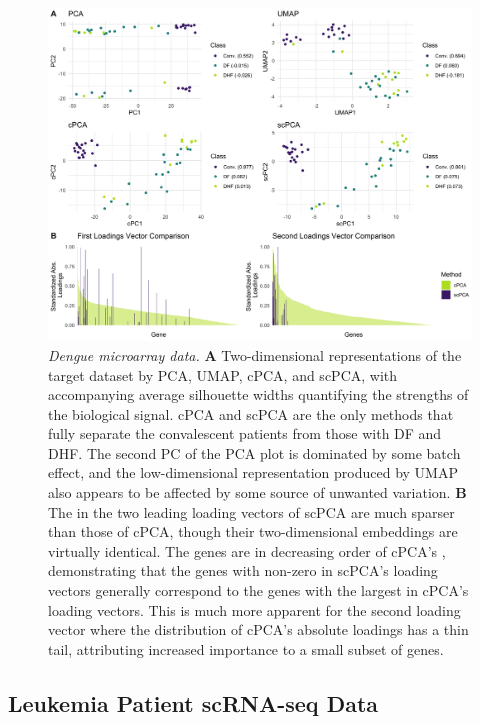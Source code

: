 \begin{figure}
  \centering
  \includegraphics[width = \textwidth]{figures/dengue_results}
  \caption{
  {\em Dengue microarray data.}
  \textbf{A} Two-dimensional representations of the target dataset by PCA, UMAP, cPCA, and scPCA, with accompanying average silhouette widths quantifying the strengths of the biological signal.  cPCA and scPCA are the only methods that fully separate the convalescent patients from those with DF and DHF. The second PC of the PCA plot is dominated by some batch effect, and the low-dimensional representation produced by UMAP also appears to be affected by some source of unwanted variation. \textbf{B} The  in the two leading loading vectors of scPCA are much sparser than those of cPCA, though their two-dimensional embeddings are virtually identical. The genes are in decreasing order of cPCA's , demonstrating that the genes with non-zero  in scPCA's loading vectors generally correspond to the genes with the largest  in cPCA's loading vectors. This is much more apparent for the second loading vector where the distribution of cPCA's absolute loadings has a thin tail, attributing increased importance to a small subset of genes.}
  \label{fig:dengue}
\end{figure}

\subsection{Leukemia Patient scRNA-seq Data}\label{leukemia_data}

